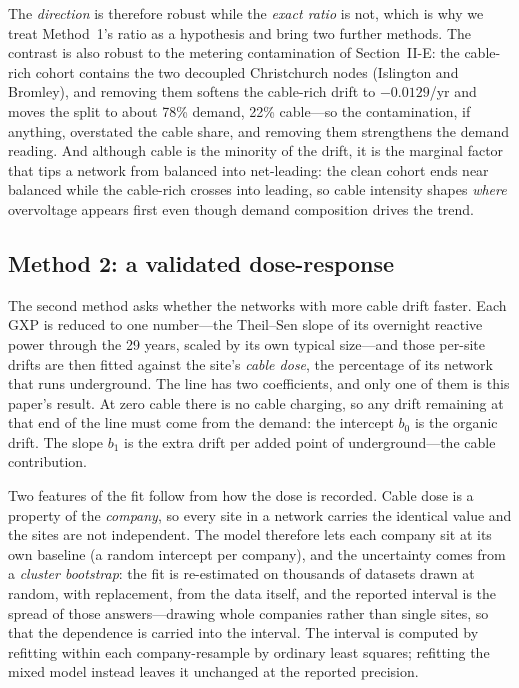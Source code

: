 \documentclass[journal]{IEEEtran}
\begin{document}
The \emph{direction} is therefore robust while the \emph{exact ratio} is not, which is why we treat Method~1's
ratio as a hypothesis and bring two further methods. The contrast is also robust to
the metering contamination of Section~II-E:
the cable-rich cohort contains the two decoupled Christchurch nodes
(Islington and Bromley), and removing them softens the cable-rich drift to
$-0.0129$/yr and moves the split to about 78\% demand, 22\% cable---so the
contamination, if anything, overstated the cable share, and removing them
strengthens the demand reading. And although cable is the minority of the drift, it is the marginal factor
that tips a network from balanced into net-leading: the clean cohort ends near
balanced while the cable-rich crosses into leading, so cable intensity shapes
\emph{where} overvoltage appears first even though demand composition drives the
trend.

\subsection{Method 2: a validated dose-response}
The second method asks whether the networks with more cable drift faster. Each
GXP is reduced to one number---the Theil--Sen slope of its overnight reactive
power through the 29 years, scaled by its own typical size---and those per-site
drifts are then fitted against the site's \emph{cable dose}, the percentage of
its network that runs underground. The line has two coefficients, and only one of them is this paper's
result. At zero cable there is no cable charging, so any drift remaining at that
end of the line must come from the demand: the intercept $b_0$ is the organic
drift. The slope $b_1$ is the extra drift per added point of underground---the
cable contribution.

Two features of the fit follow from how the dose is recorded. Cable dose is a
property of the \emph{company}, so every site in a network carries the identical
value and the sites are not independent. The model therefore lets each company
sit at its own baseline (a random intercept per company), and the uncertainty
comes from a \emph{cluster bootstrap}: the fit is re-estimated on thousands of
datasets drawn at random, with replacement, from the data itself, and the
reported interval is the spread of those answers---drawing whole companies
rather than single sites, so that the dependence is carried into the
interval. The interval is computed by refitting within each company-resample by
ordinary least squares; refitting the mixed model instead leaves it unchanged at
the reported precision.
\end{document}
